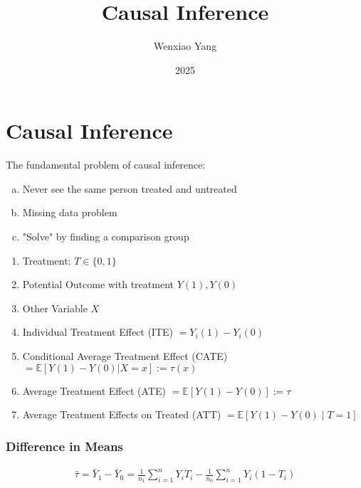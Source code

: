 \documentclass[11pt]{elegantbook}
\title{Causal Inference}
\author{Wenxiao Yang}
\institute{Haas School of Business, University of California Berkeley}
\date{2025}
\begin{document}
\maketitle

\frontmatter
\tableofcontents

\mainmatter



\chapter{Causal Inference}
The fundamental problem of causal inference:
\begin{enumerate}[(a).]
    \item Never see the same person treated and untreated
    \item Missing data problem
    \item "Solve" by finding a comparison group
\end{enumerate}

\begin{definition}
    \normalfont
    \begin{enumerate}[$\circ$]
        \item Treatment: $T\in\{0,1\}$
        \item Potential Outcome with treatment $Y(1), Y(0)$
        \item Other Variable $X$
        \item Individual Treatment Effect (ITE) $= Y_i(1)-Y_i(0)$
        \item Conditional Average Treatment Effect (CATE) $=\mathbb{E}[Y(1)-Y(0)|X=x]:=\tau(x)$
        \item Average Treatment Effect (ATE) $=\mathbb{E}[Y(1)-Y(0)]:=\tau$
        \item Average Treatment Effects on Treated (ATT) $=\mathbb{E}[Y(1)-Y(0)\mid T=1]$
    \end{enumerate}
\end{definition}


\subsection*{Difference in Means}
\begin{equation}
    \begin{aligned}
        \hat{\tau}=\bar{Y}_1-\bar{Y}_0=\frac{1}{n_1}\sum_{i=1}^n Y_i T_i - \frac{1}{n_0}\sum_{i=1}^n Y_i(1-T_i)
    \end{aligned}
    \nonumber
\end{equation}
\end{document}
